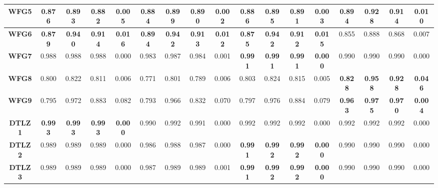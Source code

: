 \begin{table*}[t]
\begin{scriptsize}
\begin{tabular}{cc|c|c|c|c|c|c|c|c|c|c|c|c|c|c|c}
\multicolumn{1}{c|}{\textbf{WFG5}}  & 0.876          & 0.893          & 0.882          & 0.005          & 0.884          & 0.899          & 0.890          & 0.002          & 0.886          & 0.895          & 0.891          & 0.003          & \textbf{0.894} & \textbf{0.928} & \textbf{0.914} & \textbf{0.010} \\ \hline
\multicolumn{1}{c|}{\textbf{WFG6}}  & \textbf{0.879} & \textbf{0.940} & \textbf{0.914} & \textbf{0.016} & \textbf{0.894} & \textbf{0.942} & \textbf{0.913} & \textbf{0.012} & \textbf{0.875} & \textbf{0.942} & \textbf{0.912} & \textbf{0.015} & 0.855          & 0.888          & 0.868          & 0.007          \\ \hline
\multicolumn{1}{c|}{\textbf{WFG7}}  & 0.988          & 0.988          & 0.988          & 0.000          & 0.983          & 0.987          & 0.984          & 0.001          & \textbf{0.991} & \textbf{0.991} & \textbf{0.991} & \textbf{0.000} & 0.990          & 0.990          & 0.990          & 0.000          \\ \hline
\multicolumn{1}{c|}{\textbf{WFG8}}  & 0.800          & 0.822          & 0.811          & 0.006          & 0.771          & 0.801          & 0.789          & 0.006          & 0.803          & 0.824          & 0.815          & 0.005          & \textbf{0.828} & \textbf{0.958} & \textbf{0.928} & \textbf{0.046} \\ \hline
\multicolumn{1}{c|}{\textbf{WFG9}}  & 0.795          & 0.972          & 0.883          & 0.082          & 0.793          & 0.966          & 0.832          & 0.070          & 0.797          & 0.976          & 0.884          & 0.079          & \textbf{0.963} & \textbf{0.975} & \textbf{0.970} & \textbf{0.004} \\ \hline
\multicolumn{1}{c|}{\textbf{DTLZ1}} & \textbf{0.993} & \textbf{0.993} & \textbf{0.993} & \textbf{0.000} & 0.990          & 0.992          & 0.991          & 0.000          & 0.992          & 0.992          & 0.992          & 0.000          & 0.992          & 0.992          & 0.992          & 0.000          \\ \hline
\multicolumn{1}{c|}{\textbf{DTLZ2}} & 0.989          & 0.989          & 0.989          & 0.000          & 0.986          & 0.988          & 0.987          & 0.000          & \textbf{0.991} & \textbf{0.992} & \textbf{0.992} & \textbf{0.000} & 0.990          & 0.990          & 0.990          & 0.000          \\ \hline
\multicolumn{1}{c|}{\textbf{DTLZ3}} & 0.989          & 0.989          & 0.989          & 0.000          & 0.987          & 0.989          & 0.989          & 0.001          & \textbf{0.991} & \textbf{0.992} & \textbf{0.992} & \textbf{0.000} & 0.990          & 0.990          & 0.990          & 0.000          \\ \hline

\end{tabular}
\end{scriptsize}
\end{table*}

